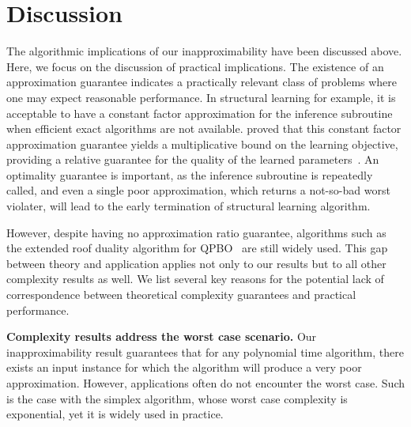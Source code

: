 \section{Discussion}\label{sec:discussion}

The algorithmic implications of our inapproximability have been discussed above. Here, we focus on the discussion of practical implications. 
The existence of an approximation guarantee indicates a practically relevant class of problems where one may expect reasonable performance. In structural learning for example, it is acceptable to have a constant factor approximation for the inference subroutine when efficient exact algorithms are not available. \citeauthor{finley2008training} proved that this constant factor approximation guarantee yields a multiplicative bound on the learning objective, providing a relative guarantee for the quality of the learned parameters~\cite{finley2008training}. An optimality guarantee is important, as the inference subroutine is repeatedly called, and even a single poor approximation, which returns a not-so-bad worst violater, will lead to the early termination of structural learning algorithm. 

However, despite having no approximation ratio guarantee, algorithms such as the extended roof duality algorithm for QPBO~\cite{rother2007optimizing} are still widely used. This gap between theory and application applies not only to our results but to all other complexity results as well. We list several key reasons for the potential lack of correspondence between theoretical complexity guarantees and practical performance.

\textbf{Complexity results address the worst case scenario.} Our inapproximability result guarantees that for any polynomial time algorithm, there exists an input instance for which the algorithm will produce a very poor approximation. However, applications often do not encounter the worst case. Such is the case with the simplex algorithm, whose worst case complexity is exponential, yet it is widely used in practice. 


